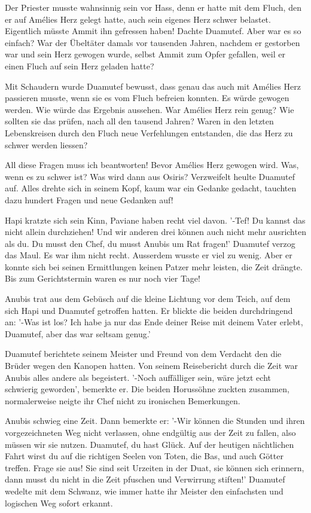 \documentclass[11pt,titlepage,a5paper]{book}
\begin{document}
Der Priester musste wahnsinnig sein vor Hass, denn er hatte mit dem Fluch, den er auf Amélies Herz gelegt hatte, auch sein eigenes Herz schwer belastet. Eigentlich müsste Ammit ihn gefressen haben! Dachte Duamutef. Aber war es so einfach? War der Übeltäter damals vor tausenden Jahren, nachdem er gestorben war und sein Herz gewogen wurde, selbst Ammit zum Opfer gefallen, weil er einen Fluch auf sein Herz geladen hatte? 

Mit Schaudern wurde Duamutef bewusst, dass genau das auch mit Amélies Herz passieren musste, wenn sie es vom Fluch befreien konnten. Es würde gewogen werden. Wie würde das Ergebnis aussehen. War Amélies Herz rein genug? Wie sollten sie das prüfen, nach all den tausend Jahren? Waren in den letzten Lebenskreisen durch den Fluch neue Verfehlungen entstanden, die das Herz zu schwer werden liessen?

All diese Fragen muss ich beantworten! Bevor Amélies Herz gewogen wird. Was, wenn es zu schwer ist? Was wird dann aus Osiris? Verzweifelt heulte Duamutef auf. Alles drehte sich in seinem Kopf, kaum war ein Gedanke gedacht, tauchten dazu hundert Fragen und neue Gedanken auf!

Hapi kratzte sich sein Kinn, Paviane haben recht viel davon. '-Tef! Du kannst das nicht allein durchziehen! Und wir anderen drei können auch nicht mehr ausrichten als du. Du musst den Chef, du musst Anubis um Rat fragen!' Duamutef verzog das Maul. Es war ihm nicht recht. Ausserdem wusste er viel zu wenig. Aber er konnte sich bei seinen Ermittlungen keinen Patzer mehr leisten, die Zeit drängte. Bis zum Gerichtstermin waren es nur noch vier Tage!

Anubis trat aus dem Gebüsch auf die kleine Lichtung vor dem Teich, auf dem sich Hapi und Duamutef getroffen hatten. Er blickte die beiden durchdringend an: '-Was ist los? Ich habe ja nur das Ende deiner Reise mit deinem Vater erlebt, Duamutef, aber das war seltsam genug.' 

Duamutef berichtete seinem Meister und Freund von dem Verdacht den die Brüder wegen den Kanopen hatten. Von seinem Reisebericht durch die Zeit war Anubis alles andere als begeistert. '-Noch auffälliger sein, wäre jetzt echt schwierig geworden', bemerkte er. Die beiden Horussöhne zuckten zusammen, normalerweise neigte ihr Chef nicht zu ironischen Bemerkungen.

Anubis schwieg eine Zeit. Dann bemerkte er: '-Wir können die Stunden und ihren vorgezeichneten Weg nicht verlassen, ohne endgültig aus der Zeit zu fallen, also müssen wir sie nutzen. Duamutef, du hast Glück. Auf der heutigen nächtlichen Fahrt wirst du auf die richtigen Seelen von Toten, die Bas, und auch Götter treffen. Frage sie aus! Sie sind seit Urzeiten in der Duat, sie können sich erinnern, dann musst du nicht in die Zeit pfuschen und Verwirrung stiften!' Duamutef wedelte mit dem Schwanz, wie immer hatte ihr Meister den einfachsten und logischen Weg sofort erkannt.
\end{document}
